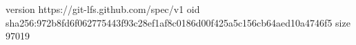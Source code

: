 version https://git-lfs.github.com/spec/v1
oid sha256:972b8fd6f062775443f93c28ef1af8c0186d00f425a5c156cb64aed10a4746f5
size 97019
